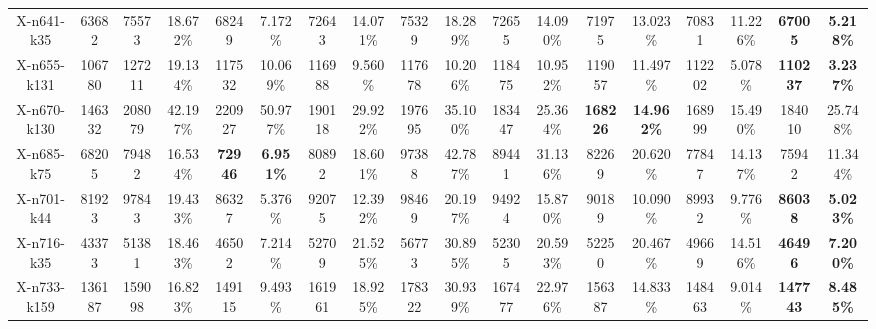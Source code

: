 \documentclass{article}
\theoremstyle{plain}
\theoremstyle{definition}
\theoremstyle{remark}
\begin{document}
\begin{table}[htbp]
\begin{center}
\begin{small}
{\begin{tabular}{cc|cccccccccccccccc}
X-n641-k35       & 63682      & 75573        & 18.672\%      & 68249           & 7.172\%          & 72643        & 14.071\%      & 75329        & 18.289\%      & 72655         & 14.090\%       & 71975           & 13.023\%          & 70831           & 11.226\%          & \cellcolor[HTML]{D0CECE}\textbf{67005}   & \cellcolor[HTML]{D0CECE}\textbf{5.218\%}  \\
X-n655-k131      & 106780     & 127211       & 19.134\%      & 117532          & 10.069\%         & 116988       & 9.560\%       & 117678       & 10.206\%      & 118475        & 10.952\%       & 119057          & 11.497\%          & 112202          & 5.078\%           & \cellcolor[HTML]{D0CECE}\textbf{110237}  & \cellcolor[HTML]{D0CECE}\textbf{3.237\%}  \\
X-n670-k130      & 146332     & 208079       & 42.197\%      & 220927          & 50.977\%         & 190118       & 29.922\%      & 197695       & 35.100\%      & 183447        & 25.364\%       & \cellcolor[HTML]{D0CECE}\textbf{168226} & \cellcolor[HTML]{D0CECE}\textbf{14.962\%} & 168999          & 15.490\%          & 184010           & 25.748\%          \\
X-n685-k75       & 68205      & 79482        & 16.534\%      & \cellcolor[HTML]{D0CECE}\textbf{72946}           & \cellcolor[HTML]{D0CECE}\textbf{6.951\%} & 80892        & 18.601\%      & 97388        & 42.787\%      & 89441         & 31.136\%       & 82269           & 20.620\%          & 77847           & 14.137\%          & 75942            & 11.344\%          \\
X-n701-k44       & 81923      & 97843        & 19.433\%      & 86327           & 5.376\%          & 92075        & 12.392\%      & 98469        & 20.197\%      & 94924         & 15.870\%       & 90189           & 10.090\%          & 89932           & 9.776\%           & \cellcolor[HTML]{D0CECE}\textbf{86038}   & \cellcolor[HTML]{D0CECE}\textbf{5.023\%}  \\
X-n716-k35       & 43373      & 51381        & 18.463\%      & 46502           & 7.214\%          & 52709        & 21.525\%      & 56773        & 30.895\%      & 52305         & 20.593\%       & 52250           & 20.467\%          & 49669           & 14.516\%          & \cellcolor[HTML]{D0CECE}\textbf{46496}   & \cellcolor[HTML]{D0CECE}\textbf{7.200\%}  \\
X-n733-k159      & 136187     & 159098       & 16.823\%      & 149115          & 9.493\%          & 161961       & 18.925\%      & 178322       & 30.939\%      & 167477        & 22.976\%       & 156387          & 14.833\%          & 148463          & 9.014\%           & \cellcolor[HTML]{D0CECE}\textbf{147743}  & \cellcolor[HTML]{D0CECE}\textbf{8.485\%}  \\

\end{tabular}}
\end{small}
\end{center}
\end{table}
\end{document}
